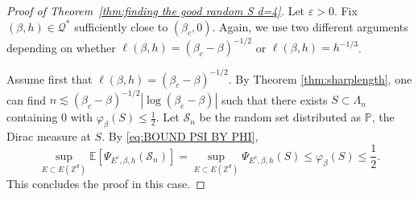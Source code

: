 \documentclass[11pt,a4paper]{article}
\numberwithin{equation}{section}
\theoremstyle{plain}
\theoremstyle{definition}
\begin{document}
\begin{proof}[Proof of Theorem~\textup{\ref{thm:finding the good random S d=4}}] Let $\varepsilon>0$.
Fix $(\beta,h)\in \mathcal Q^*$ sufficiently close to $(\beta_c,0)$. Again, we use two different arguments depending on whether $\ell(\beta,h)=(\beta_c-\beta)^{-1/2}$ or $\ell(\beta,h)=h^{-1/3}$. 

 Assume first that $\ell(\beta,h)=(\beta_c-\beta)^{-1/2}$. By Theorem \ref{thm:sharplength}, one can find $n\lesssim (\beta_c-\beta)^{-1/2}|\log (\beta_c-\beta)|$ such that there exists $S\subset \Lambda_n$ containing $0$ with $\varphi_{\beta}(S)\leq \tfrac{1}{2}$. Let $\mathcal S_n$ be the random set distributed as $\mathbb P$, the Dirac measure at $S$. By \eqref{eq:BOUND PSI BY PHI},
\begin{equation}
	\sup_{E\subset E(\mathbb Z^d)}\mathbb E[\Psi_{E^c,\beta,h}(\mathcal S_n)]=\sup_{E\subset E(\mathbb Z^d)}\Psi_{E^c,\beta,h}(S)\leq \varphi_{\beta}(S)\leq \frac{1}{2}.
\end{equation}
This concludes the proof in this case.


\end{proof}
\end{document}
